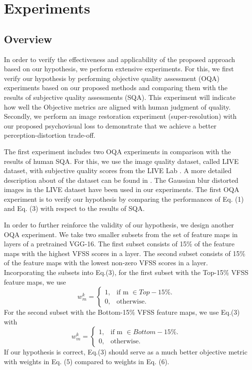 \documentclass[10pt,twocolumn,letterpaper]{article}
\begin{document}
\section{Experiments}
\subsection{Overview}
In order to verify the effectiveness and applicability of the proposed approach based on our hypothesis, we perform extensive experiments. For this, we first verify our hypothesis by performing objective quality assessment (OQA) experiments based on our proposed methods and comparing them with the results of subjective quality assessments (SQA). This experiment will indicate how well the Objective metrics are aligned with human judgment of quality. Secondly, we perform an image restoration experiment (super-resolution) with our proposed psychovisual loss to demonstrate that we achieve a better perception-distortion trade-off.

The first experiment includes two OQA experiments in comparison with the results of human SQA. For this, we use the image quality dataset, called LIVE dataset, with subjective quality scores from the LIVE Lab \cite{4}. A more detailed description about of the dataset can be found in \cite{4}. The Gaussian blur distorted images in the LIVE dataset have been used in our experiments. The first OQA experiment is to verify our hypothesis by comparing the performances of Eq. (1) and Eq. (3) with respect to the results of SQA.

In order to further reinforce the validity of our hypothesis, we design another OQA experiment. We take two smaller subsets from the set of feature maps in layers of a pretrained VGG-16. The first subset consists of 15\% of the feature maps with the highest VFSS scores in a layer. The second subset consists of 15\% of the feature maps with the lowest non-zero VFSS scores in a layer. Incorporating the subsets into Eq.(3), for the first subset with the Top-15\% VFSS feature maps, we use
\begin{equation}
  w_m^k=\begin{cases}
    1, & \text{if m $\in Top-15\%$}.\\
    0, & \text{otherwise}.
  \end{cases}
\end{equation}
For the second subset with the Bottom-15\% VFSS feature maps, we use Eq.(3) with
\begin{equation}
  w_m^k=\begin{cases}
    1, & \text{if m $\in Bottom-15\%$}.\\
    0, & \text{otherwise}.
  \end{cases}
\end{equation}
If our hypothesis is correct, Eq.(3) should serve as a much better objective metric with weights in Eq. (5) compared to weights in Eq. (6).
\end{document}
